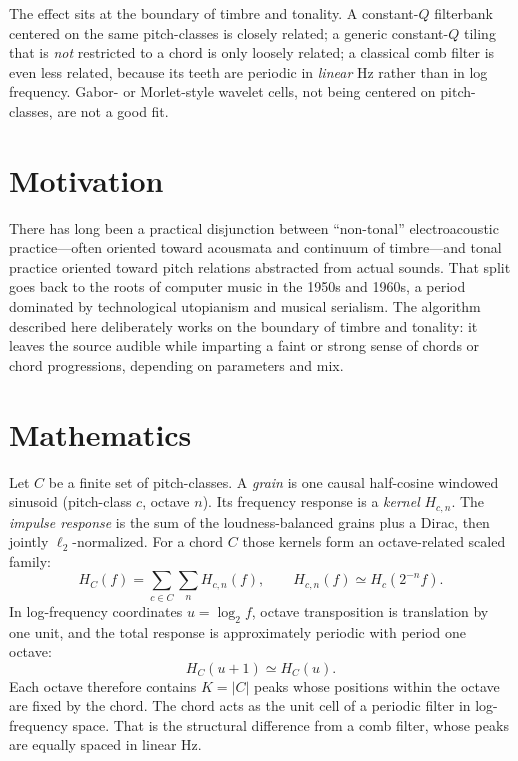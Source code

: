 \documentclass[runningheads,a4paper]{llncs}
\begin{document}
The effect sits at the boundary of timbre and tonality. A constant-$Q$
filterbank centered on the same pitch-classes is closely related; a generic
constant-$Q$ tiling that is \emph{not} restricted to a chord is only loosely
related; a classical comb filter is even less related, because its teeth are
periodic in \emph{linear} Hz rather than in log frequency. Gabor- or
Morlet-style wavelet cells, not being centered on pitch-classes, are not a
good fit.

\section{Motivation}

There has long been a practical disjunction between ``non-tonal''
electroacoustic practice---often oriented toward acousmata and continuum of
timbre---and tonal practice oriented toward pitch relations abstracted from
actual sounds. That split goes back to the roots of computer music in the
1950s and 1960s, a period dominated by technological utopianism and musical
serialism. The algorithm described here deliberately works on the boundary of
timbre and tonality: it leaves the source audible while imparting a faint or
strong sense of chords or chord progressions, depending on parameters and mix.

\section{Mathematics}

Let $C$ be a finite set of pitch-classes. A \emph{grain} is one causal
half-cosine windowed sinusoid (pitch-class $c$, octave $n$). Its frequency
response is a \emph{kernel} $H_{c,n}$. The \emph{impulse response} is the sum
of the loudness-balanced grains plus a Dirac, then jointly $\ell_2$-normalized.
For a chord $C$ those kernels form an octave-related scaled family:
\[
H_C(f)
=
\sum_{c\in C}\sum_n H_{c,n}(f),
\qquad
H_{c,n}(f)
\simeq
H_c\!\left(2^{-n}f\right).
\]
In log-frequency coordinates $u=\log_2 f$, octave transposition is translation
by one unit, and the total response is approximately periodic with period one
octave:
\[
H_C(u+1)\simeq H_C(u).
\]
Each octave therefore contains $K=|C|$ peaks whose positions within the octave
are fixed by the chord. The chord acts as the unit cell of a periodic filter
in log-frequency space. That is the structural difference from a comb filter,
whose peaks are equally spaced in linear Hz.
\end{document}
